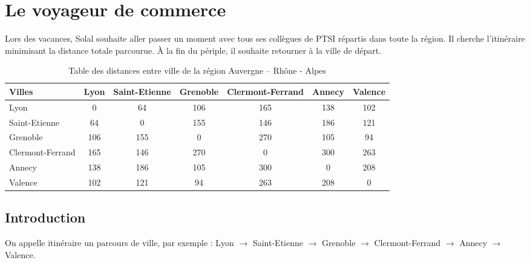 \section*{Le voyageur de commerce}

Lors des vacances, Solal souhaite aller passer un moment avec tous ses collègues de PTSI répartis dans toute la région. Il cherche l'itinéraire minimisant la distance totale parcourue. À la fin du périple, il souhaite retourner à la ville de départ. 
\begin{table*}[!h]
\begin{center}
\begin{tabular}{p{3.5cm}  cccccc}
\hline 
Villes 				& Lyon 	& Saint-Etienne 	& Grenoble & Clermont-Ferrand 	& Annecy 	& Valence 	\\
\hline
Lyon 				& 0 		& 64 			& 106 	& 165			& 138	& 102 	\\
Saint-Etienne 		& 64		& 0			& 155	& 146 			& 186 	& 121 	\\	
Grenoble 			& 106	& 155		& 0		& 270 			& 105 	& 94		\\
Clermont-Ferrand 	& 165	& 146 		& 270	& 0				& 300 	& 263 	\\
Annecy			& 138	& 186		& 105 	& 300			& 0		& 208 	\\
Valence 			& 102	& 121 		& 94		& 263			& 208 	& 0\\
\hline 
\end{tabular}
\end{center}
\caption{Table des distances entre ville de la région Auvergne -- Rhône - Alpes \label{tab:dist}}
\end{table*}

\subsection*{Introduction}
On appelle itinéraire un parcours de ville, par exemple : 
Lyon $\rightarrow $ Saint-Etienne $\rightarrow $ Grenoble $\rightarrow $ Clermont-Ferrand $\rightarrow $ Annecy 	$\rightarrow $ Valence. 


